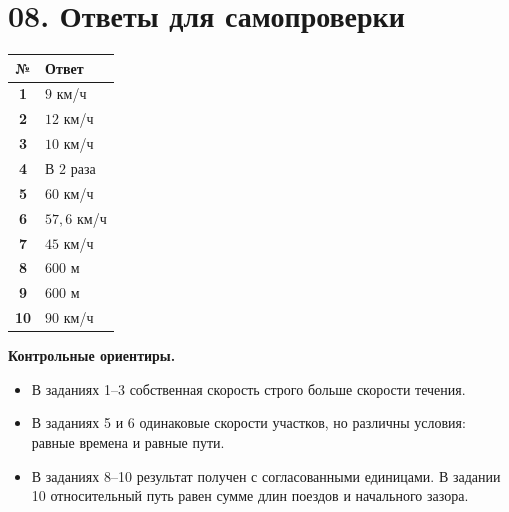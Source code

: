 \documentclass[a4paper,12pt]{article}
\newcommand{\key}[1]{\textcolor{darkaccent}{\bfseries #1}}
\newcommand{\ruleline}{\par\vspace{.15em}{\color{accent!65}\hrule height .6pt}\vspace{.65em}}
\begin{document}
\clearpage
\section*{08. Ответы для самопроверки}
\ruleline
\begin{center}
\renewcommand{\arraystretch}{1.65}
\begin{tabularx}{.90\linewidth}{>{\bfseries}cX}
\toprule
№ & Ответ\\
\midrule
1 & $9$ км/ч\\
2 & $12$ км/ч\\
3 & $10$ км/ч\\
4 & В $2$ раза\\
5 & $60$ км/ч\\
6 & $57{,}6$ км/ч\\
7 & $45$ км/ч\\
8 & $600$ м\\
9 & $600$ м\\
10 & $90$ км/ч\\
\bottomrule
\end{tabularx}
\end{center}
\vspace{6mm}
\key{Контрольные ориентиры.}
\begin{itemize}
\item В заданиях 1--3 собственная скорость строго больше скорости течения.
\item В заданиях 5 и 6 одинаковые скорости участков, но различны условия: равные времена и равные пути.
\item В заданиях 8--10 результат получен с согласованными единицами. В задании 10 относительный путь равен сумме длин поездов и начального зазора.
\end{itemize}
\end{document}
